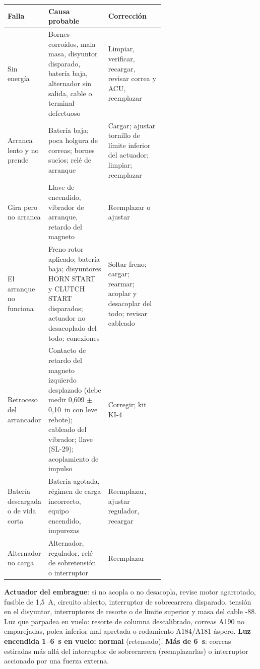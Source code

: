\begin{center}
\small
\begin{tabularx}{\linewidth}{@{}>{\raggedright\arraybackslash}p{0.24\linewidth}>{\raggedright\arraybackslash}p{0.38\linewidth}>{\raggedright\arraybackslash}X@{}}
\toprule
Falla & Causa probable & Corrección \\
\midrule
Sin energía & Bornes corroídos, mala masa, disyuntor disparado, batería baja, alternador sin salida, cable o terminal defectuoso & Limpiar, verificar, recargar, revisar correa y ACU, reemplazar \\
Arranca lento y no prende & Batería baja; poca holgura de correas; bornes sucios; relé de arranque & Cargar; ajustar tornillo de límite inferior del actuador; limpiar; reemplazar \\
Gira pero no arranca & Llave de encendido, vibrador de arranque, retardo del magneto & Reemplazar o ajustar \\
El arranque no funciona & Freno rotor aplicado; batería baja; disyuntores HORN START y CLUTCH START disparados; actuador no desacoplado del todo; conexiones & Soltar freno; cargar; rearmar; acoplar y desacoplar del todo; revisar cableado \\
Retroceso del arrancador & Contacto de retardo del magneto izquierdo desplazado (debe medir 0,609 $\pm$ 0,10~in con leve rebote); cableado del vibrador; llave (SL-29); acoplamiento de impulso & Corregir; kit KI-4 \\
Batería descargada o de vida corta & Batería agotada, régimen de carga incorrecto, equipo encendido, impurezas & Reemplazar, ajustar regulador, recargar \\
Alternador no carga & Alternador, regulador, relé de sobretensión o interruptor & Reemplazar \\
\bottomrule
\end{tabularx}
\end{center}

\textbf{Actuador del embrague}: si no acopla o no desacopla, revise motor agarrotado, fusible de 1,5~A, circuito abierto, interruptor de sobrecarrera disparado, tensión en el disyuntor, interruptores de resorte o de límite superior y masa del cable -88. Luz que parpadea en vuelo: resorte de columna descalibrado, correas A190 no emparejadas, polea inferior mal apretada o rodamiento A184/A181 áspero. \textbf{Luz encendida 1--6~s en vuelo: normal} (retensado). \textbf{Más de 6~s}: correas estiradas más allá del interruptor de sobrecarrera (reemplazarlas) o interruptor accionado por una fuerza externa.

